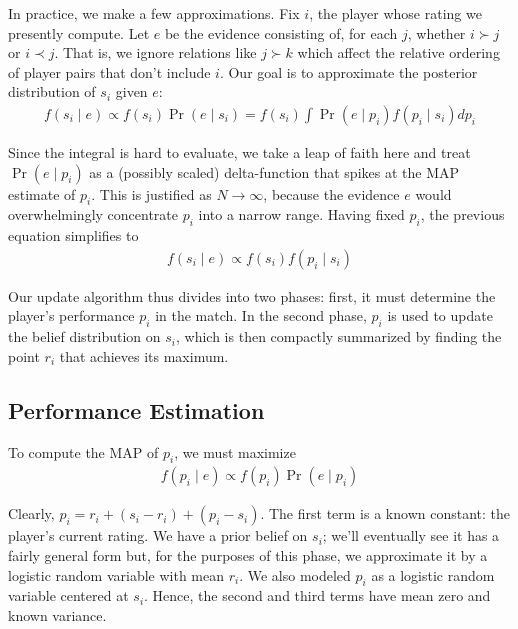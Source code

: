 \documentclass{article}
\begin{document}
In practice, we make a few approximations. Fix $i$, the player whose rating we presently compute. Let $e$ be the evidence consisting of, for each $j$, whether $i \succ j$ or $i \prec j$. That is, we ignore relations like $j \succ k$ which affect the relative ordering of player pairs that don't include $i$. Our goal is to approximate the posterior distribution of $s_i$ given $e$:
\begin{align}
f(s_i\mid e) \propto f(s_i)\Pr(e\mid s_i) = f(s_i)\int \Pr(e\mid p_i)f(p_i\mid s_i)dp_i
\end{align}

Since the integral is hard to evaluate, we take a leap of faith here and treat $\Pr(e\mid p_i)$ as a (possibly scaled) delta-function that spikes at the MAP estimate of $p_i$. This is justified as $N \rightarrow \infty$, because the evidence $e$ would overwhelmingly concentrate $p_i$ into a narrow range. Having fixed $p_i$, the previous equation simplifies to
\begin{align}
f(s_i\mid e) \propto f(s_i)f(p_i\mid s_i)
\end{align}

Our update algorithm thus divides into two phases: first, it must determine the player's performance $p_i$ in the match. In the second phase, $p_i$ is used to update the belief distribution on $s_i$, which is then compactly summarized by finding the point $r_i$ that achieves its maximum.

\subsection{Performance Estimation}

To compute the MAP of $p_i$, we must maximize
\begin{align}
f(p_i\mid e) \propto f(p_i) \Pr(e\mid p_i)
\end{align}

Clearly, $p_i = r_i + (s_i-r_i) + (p_i-s_i)$. The first term is a known constant: the player's current rating. We have a prior belief on $s_i$; we'll eventually see it has a fairly general form but, for the purposes of this phase, we approximate it by a logistic random variable with mean $r_i$. We also modeled $p_i$ as a logistic random variable centered at $s_i$. Hence, the second and third terms have mean zero and known variance.
\end{document}
